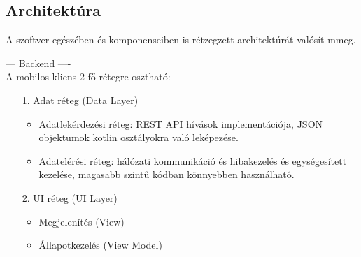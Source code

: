\subsection{Architektúra}

A szoftver egészében és komponenseiben is rétzegzett architektúrát valósít mmeg.

--- Backend ----
\\




\noindent A mobilos kliens 2 fő rétegre osztható:

\begin{itemize}
    \item  [1.] Adat réteg (Data Layer)
    \begin{itemize}
        \item Adatlekérdezési réteg: REST API hívások implementációja, JSON objektumok kotlin osztályokra való leképezése.
        \item Adatelérési réteg: hálózati kommunikáció és hibakezelés és egységesített kezelése, magasabb szintű kódban könnyebben használható.
    \end{itemize}
    \item  [2.] UI réteg (UI Layer)
    \begin{itemize}
        \item  Megjelenítés (View)
        \item  Állapotkezelés (View Model)
    \end{itemize}
\end{itemize}